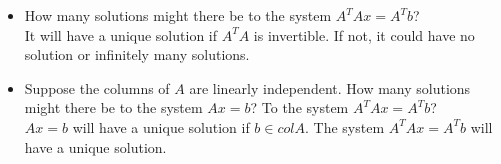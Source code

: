 \documentclass[11pt]{amsart}
\begin{document}
\begin{enumerate}
\begin{enumerate}
\begin{itemize}
\item How many solutions might there be to the system $A^TA x = A^T b$? \\
It will have a unique solution if $A^TA$ is invertible. If not, it could have no solution or infinitely many solutions. 
\item Suppose the columns of $A$ are linearly independent. How many solutions might there be to the system $Ax=b$? To the system $A^TAx = A^Tb$? \\
$Ax=b$ will have a unique solution if $b \in col A.$ The system $A^TAx = A^Tb$ will have a unique solution.
\end{itemize}




\end{enumerate} 



\end{enumerate}

\bigskip \bigskip
\end{document}

